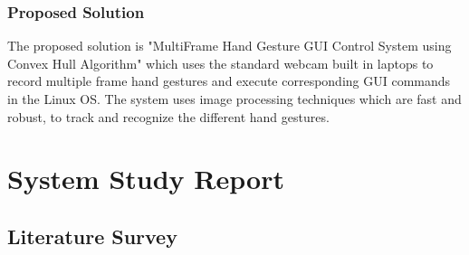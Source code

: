 \documentclass[11pt]{report}
\begin{document}
\subsection{Proposed Solution}
The proposed solution is "MultiFrame Hand Gesture GUI Control System using Convex Hull Algorithm" which uses the standard webcam built in laptops to record multiple frame hand gestures and execute corresponding GUI commands in the Linux OS. The system uses image processing techniques which are fast and robust, to track and recognize the different hand gestures.



\chapter{System Study Report}
\section{Literature Survey}
\end{document}
